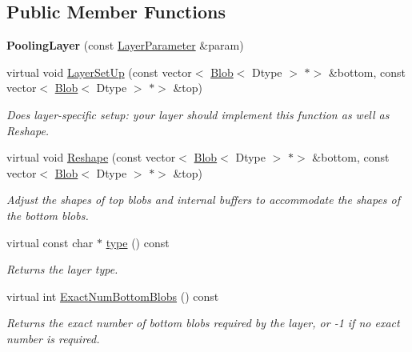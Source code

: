 \subsection*{Public Member Functions}
\begin{DoxyCompactItemize}
\item 
\mbox{\label{classcaffe_1_1_pooling_layer_a3bc79b6101f5e21bbbfa02b7726d650c}} 
{\bfseries Pooling\+Layer} (const \mbox{\hyperlink{classcaffe_1_1_layer_parameter}{Layer\+Parameter}} \&param)
\item 
virtual void \mbox{\hyperlink{classcaffe_1_1_pooling_layer_aa310fbe7d766ac96a1957aca6a3c4469}{Layer\+Set\+Up}} (const vector$<$ \mbox{\hyperlink{classcaffe_1_1_blob}{Blob}}$<$ Dtype $>$ $\ast$$>$ \&bottom, const vector$<$ \mbox{\hyperlink{classcaffe_1_1_blob}{Blob}}$<$ Dtype $>$ $\ast$$>$ \&top)
\begin{DoxyCompactList}\small\item\em Does layer-\/specific setup\+: your layer should implement this function as well as Reshape. \end{DoxyCompactList}\item 
virtual void \mbox{\hyperlink{classcaffe_1_1_pooling_layer_ac652e08deffb0eeb6c3113abb55eb641}{Reshape}} (const vector$<$ \mbox{\hyperlink{classcaffe_1_1_blob}{Blob}}$<$ Dtype $>$ $\ast$$>$ \&bottom, const vector$<$ \mbox{\hyperlink{classcaffe_1_1_blob}{Blob}}$<$ Dtype $>$ $\ast$$>$ \&top)
\begin{DoxyCompactList}\small\item\em Adjust the shapes of top blobs and internal buffers to accommodate the shapes of the bottom blobs. \end{DoxyCompactList}\item 
\mbox{\label{classcaffe_1_1_pooling_layer_a630cde9866e35304372f3f93d7f6a307}} 
virtual const char $\ast$ \mbox{\hyperlink{classcaffe_1_1_pooling_layer_a630cde9866e35304372f3f93d7f6a307}{type}} () const
\begin{DoxyCompactList}\small\item\em Returns the layer type. \end{DoxyCompactList}\item 
virtual int \mbox{\hyperlink{classcaffe_1_1_pooling_layer_a07dc8b1c3bfa3a997dd86b4e53f54019}{Exact\+Num\+Bottom\+Blobs}} () const
\begin{DoxyCompactList}\small\item\em Returns the exact number of bottom blobs required by the layer, or -\/1 if no exact number is required. \end{DoxyCompactList}\item 

\end{DoxyCompactItemize}

